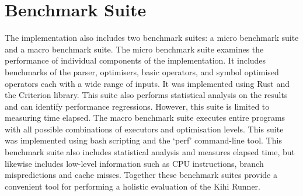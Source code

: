 \section{Benchmark Suite}
The implementation also includes two benchmark suites: a micro benchmark suite and a macro benchmark suite. The micro benchmark suite examines the performance of individual components of the implementation. It includes benchmarks of the parser, optimisers, basic operators, and symbol optimised operators each with a wide range of inputs. It was implemented using Rust and the Criterion library. This suite also performs statistical analysis on the results and can identify performance regressions. However, this suite is limited to measuring time elapsed. The macro benchmark suite executes entire programs with all possible combinations of executors and optimisation levels. This suite was implemented using bash scripting and the `perf' command-line tool. This benchmark suite also includes statistical analysis and measures elapsed time, but likewise includes low-level information such as CPU instructions, branch mispredictions and cache misses. Together these benchmark suites provide a convenient tool for performing a holistic evaluation of the Kihi Runner.